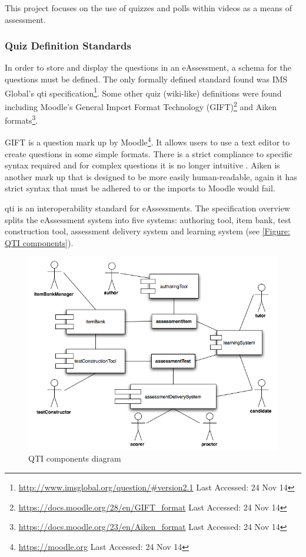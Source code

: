 This project focuses on the use of quizzes and polls within videos as a means of assessment.

\subsubsection{Quiz Definition Standards}
\label{Subsubsection:Quiz Definition Standards}
In order to store and display the questions in an \gls{eAssessment}, a schema for the questions must be defined. The only formally defined standard found was IMS Global's \gls{qti} specification\footnote{\url{http://www.imsglobal.org/question/\#version2.1} Last Accessed: 24 Nov 14}. Some other quiz (wiki-like) definitions were found including Moodle's General Import Format Technology (GIFT)\footnote{\url{https://docs.moodle.org/28/en/GIFT_format} Last Accessed: 24 Nov 14} and Aiken formats\footnote{\url{https://docs.moodle.org/23/en/Aiken_format} Last Accessed: 24 Nov 14}.

GIFT is a question mark up by Moodle\footnote{\url{https://moodle.org} Last Accessed: 24 Nov 14}. It allows users to use a text editor to create questions in some simple formats. There is a strict compliance to specific syntax required and for complex questions it is no longer intuitive \citep{failQTI}. Aiken is another mark up that is designed to be more easily human-readable, again it has strict syntax that must be adhered to or the imports to Moodle would fail.

\gls{qti} is an interoperability standard for eAssessments. The specification overview \citep{qtiOverview} splits the \gls{eAssessment} system into five systems: authoring tool, item bank, test construction tool, assessment delivery system and learning system (see \autoref{Figure: QTI components}).

\begin{figure}[h]
	\centering 
		\includegraphics[scale=0.3]{../figures/componentsQTI.png} 		
	\caption{\label{Figure: QTI components} QTI components diagram \citep{qtiOverview}} 	
\end{figure}

